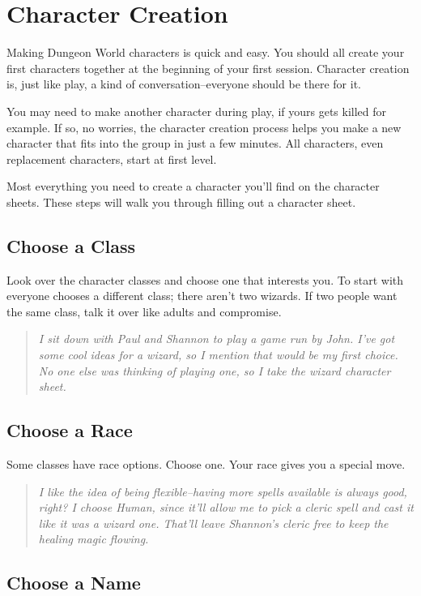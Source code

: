 \chapter{Character Creation}

 Making Dungeon World characters is quick and easy. You should all create your first characters together at the beginning of your first session. Character creation is, just like play, a kind of conversation--everyone should be there for it.


 You may need to make another character during play, if yours gets killed for example. If so, no worries, the character creation process helps you make a new character that fits into the group in just a few minutes. All characters, even replacement characters, start at first level.


 Most everything you need to create a character you'll find on the character sheets. These steps will walk you through filling out a character sheet.
\section{Choose a Class}


 Look over the character classes and choose one that interests you. To start with everyone chooses a different class; there aren't two wizards. If two people want the same class, talk it over like adults and compromise.

\begin{quote}
\emph{I sit down with Paul and Shannon to play a game run by John. I've got some cool ideas for a wizard, so I mention that would be my first choice. No one else was thinking of playing one, so I take the wizard character sheet.}
\end{quote}
\section{Choose a Race}


 Some classes have race options. Choose one. Your race gives you a special move.


\begin{quote}
\emph{I like the idea of being flexible--having more spells available is always good, right? I choose Human, since it'll allow me to pick a cleric spell and cast it like it was a wizard one. That'll leave Shannon's cleric free to keep the healing magic flowing.}
\end{quote}
\section{Choose a Name}


